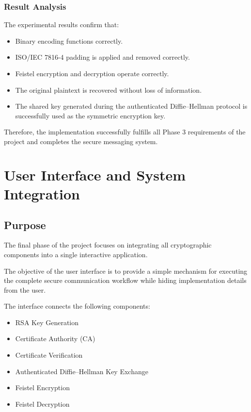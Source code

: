 \documentclass[12pt]{article}
\begin{document}
\subsubsection{Result Analysis}

The experimental results confirm that:

\begin{itemize}
\item Binary encoding functions correctly.
\item ISO/IEC 7816-4 padding is applied and removed correctly.
\item Feistel encryption and decryption operate correctly.
\item The original plaintext is recovered without loss of information.
\item The shared key generated during the authenticated Diffie--Hellman protocol is successfully used as the symmetric encryption key.
\end{itemize}

Therefore, the implementation successfully fulfills all Phase 3 requirements of the project and completes the secure messaging system.


\section{User Interface and System Integration}

\subsection{Purpose}

The final phase of the project focuses on integrating all cryptographic components into a single interactive application.

The objective of the user interface is to provide a simple mechanism for executing the complete secure communication workflow while hiding implementation details from the user.

The interface connects the following components:

\begin{itemize}
\item RSA Key Generation
\item Certificate Authority (CA)
\item Certificate Verification
\item Authenticated Diffie--Hellman Key Exchange
\item Feistel Encryption
\item Feistel Decryption
\end{itemize}
\end{document}
